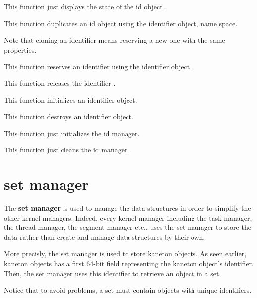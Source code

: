 	 {
	   This function just displays the state of the id object
	   .
	 }

	 {
	   This function duplicates an id object using the 
	   identifier object, name space.

	   Note that cloning an identifier means reserving a new one
	   with the same properties.
	 }

	  {
	    This function reserves an identifier  using the
	    identifier object .
	  }

	 {
	   This function releases the identifier .
	 }

	 {
	   This function initializes an identifier object.
	 }

	 {
	   This function destroys an identifier object.
	 }

	 {
	   This function just initializes the id manager.
	 }

	 {
	   This function just cleans the id manager.
	 }

%
%

\section{set manager}

The \textbf{set manager} is used to manage the data structures in order
to simplify the other kernel managers. Indeed, every kernel manager
including the task manager, the thread manager, the segment manager etc..
uses the set manager to store the data rather than create and manage data
structures by their own.

More precisly, the set manager is used to store kaneton objects.
As seen earlier, kaneton objects has a first 64-bit field representing
the kaneton object's identifier. Then, the set manager uses this identifier
to retrieve an object in a set.

Notice that to avoid problems, a set must contain objects with unique
identifiers.

